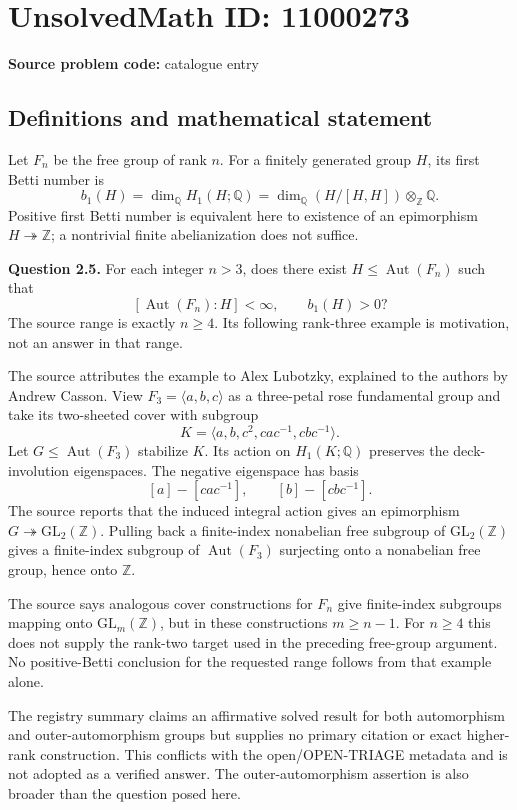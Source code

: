 \documentclass[11pt]{article}
\newcommand{\Z}{\mathbb{Z}}
\newcommand{\Q}{\mathbb{Q}}
\begin{document}
\section*{UnsolvedMath ID: 11000273}
\textbf{Source problem code:} catalogue entry
\subsection{Definitions and mathematical statement}
Let $F_n$ be the free group of rank $n$. For a finitely generated group $H$, its first Betti number is
\[
 b_1(H)=\dim_{\Q}H_1(H;\Q)=\dim_{\Q}(H/[H,H])\otimes_{\Z}\Q.
\]
Positive first Betti number is equivalent here to existence of an epimorphism $H\twoheadrightarrow\Z$; a nontrivial finite abelianization does not suffice.

\textbf{Question 2.5.} For each integer $n>3$, does there exist $H\le\operatorname{Aut}(F_n)$ such that
\[
 [\operatorname{Aut}(F_n):H]<\infty,\qquad b_1(H)>0?
\]
The source range is exactly $n\ge4$. Its following rank-three example is motivation, not an answer in that range.

The source attributes the example to Alex Lubotzky, explained to the authors by Andrew Casson. View $F_3=\langle a,b,c\rangle$ as a three-petal rose fundamental group and take its two-sheeted cover with subgroup
\[
 K=\langle a,b,c^2,cac^{-1},cbc^{-1}\rangle.
\]
Let $G\le\operatorname{Aut}(F_3)$ stabilize $K$. Its action on $H_1(K;\Q)$ preserves the deck-involution eigenspaces. The negative eigenspace has basis
\[
 [a]-[cac^{-1}],\qquad[b]-[cbc^{-1}].
\]
The source reports that the induced integral action gives an epimorphism $G\twoheadrightarrow\mathrm{GL}_2(\Z)$. Pulling back a finite-index nonabelian free subgroup of $\mathrm{GL}_2(\Z)$ gives a finite-index subgroup of $\operatorname{Aut}(F_3)$ surjecting onto a nonabelian free group, hence onto $\Z$.

The source says analogous cover constructions for $F_n$ give finite-index subgroups mapping onto $\mathrm{GL}_m(\Z)$, but in these constructions $m\ge n-1$. For $n\ge4$ this does not supply the rank-two target used in the preceding free-group argument. No positive-Betti conclusion for the requested range follows from that example alone.

The registry summary claims an affirmative solved result for both automorphism and outer-automorphism groups but supplies no primary citation or exact higher-rank construction. This conflicts with the open/OPEN-TRIAGE metadata and is not adopted as a verified answer. The outer-automorphism assertion is also broader than the question posed here.
\end{document}
